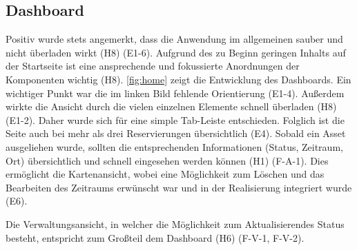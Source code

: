 \subsection{Dashboard}
Positiv wurde stets angemerkt, dass die Anwendung im allgemeinen sauber und nicht überladen wirkt (H8)
(E1-6). Aufgrund des zu Beginn geringen Inhalts auf der Startseite ist eine ansprechende und
fokussierte Anordnungen der Komponenten wichtig (H8). \ref{fig:home} zeigt die Entwicklung des
Dashboards. Ein wichtiger Punkt war die im linken Bild fehlende Orientierung (E1-4). Außerdem
wirkte die Ansicht durch die vielen einzelnen Elemente schnell überladen (H8) (E1-2). Daher wurde
sich für eine simple Tab-Leiste entschieden. Folglich ist die Seite auch bei mehr als drei
Reservierungen übersichtlich (E4). Sobald ein Asset ausgeliehen wurde, sollten die entsprechenden
Informationen (Status, Zeitraum, Ort) übersichtlich und schnell eingesehen werden können (H1)
(F-A-1). Dies ermöglicht die Kartenansicht, wobei eine Möglichkeit zum Löschen und das Bearbeiten
des Zeitraums erwünscht war und in der Realisierung integriert wurde (E6).

Die Verwaltungsansicht, in welcher die Möglichkeit zum Aktualisierendes Status besteht, entspricht zum
Großteil dem Dashboard (H6) (F-V-1, F-V-2).

